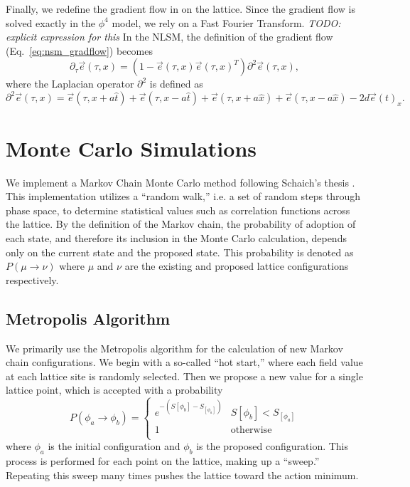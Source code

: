\documentclass[12pt]{report}
\newcommand{\e}{\vec e}
\begin{document}
Finally, we redefine the gradient flow in on the lattice. Since the gradient flow is solved exactly in the $\phi^4$ model, we rely on a Fast Fourier Transform. \textit{TODO: explicit expression for this} In the NLSM, the definition of the gradient flow (Eq.~\ref{eq:nsm_gradflow}) becomes 
\begin{equation}
    \label{eq:nsm_gradflow_disc}
    \partial_\tau \e (\tau, x) = \left( 1 - \e(\tau,x) \e(\tau,x)^T\right) \partial^2 \e(\tau,x),
\end{equation}
 where the Laplacian operator $\partial^2$ is defined as
\begin{equation*}
    \partial^2 \e(\tau,x) = \e(\tau, x+a \hat{t}) + \e(\tau,x-a\hat t) + \e(\tau, x+a \hat{x}) + \e(\tau,x-a\hat x) - 2 d \e(t)_x.
\end{equation*}


\section{Monte Carlo Simulations}
\label{sec:mc}
We implement a Markov Chain Monte Carlo method following Schaich's thesis \cite{schaich2006}. This implementation utilizes a ``random walk,'' i.e. a set of random steps through phase space, to determine statistical values such as correlation functions across the lattice. By the definition of the Markov chain, the probability of adoption of each state, and therefore its inclusion in the Monte Carlo calculation, depends only on the current state and the proposed state. This probability is denoted as $P(\mu\rightarrow\nu)$ where $\mu$ and $\nu$ are the existing and proposed lattice configurations respectively.


\subsection{Metropolis Algorithm}
We primarily use the Metropolis algorithm for the calculation of new Markov chain configurations. We begin with a so-called ``hot start,'' where each field value at each lattice site is randomly selected. Then we propose a new value for a single lattice point, which is accepted with a probability
\begin{equation}
    P(\phi_a\rightarrow\phi_b) = \begin{cases} 
        e^{-(S[\phi_b] - S_[\phi_a])} & S[\phi_b] < S_[\phi_a] \\
        1 & \mathrm{otherwise} \\
   \end{cases}
\end{equation}
where $\phi_a$ is the initial configuration and $\phi_b$ is the proposed configuration. This process is performed for each point on the lattice, making up a ``sweep.'' Repeating this sweep many times pushes the lattice toward the action minimum.
\end{document}
